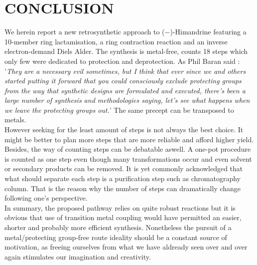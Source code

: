 \section*{CONCLUSION}
We herein report a new retrosynthetic approach to ($-$)-Himandrine featuring a 10-member ring lactamisation, a ring contraction reaction and an inverse electron-demand Diels Alder. The synthesis is metal-free, counts 18 steps which only few were dedicated to protection and deprotection. As Phil Baran said\autocite{Baran09} : \textquoteright{}\textit{They are a necessary evil sometimes, but I think that ever since we and others started putting it forward that you could consciously exclude protecting groups from the way that synthetic designs are formulated and executed, there\textquoteright{}s been a large number of synthesis and methodologies saying, let\textquoteright{}s see what happens when we leave the protecting groups out.}\textquoteright{} The same precept can be transposed to metals.\\
However seeking for the least amount of steps is not always the best choice. It might be better to plan more steps that are more reliable and afford higher yield. Besides, the way of counting steps can be debatable aswell. A one-pot procedure is counted as one step even though many transformations occur and even solvent or secondary products can be removed. It is yet commonly acknowledged that what should separate each step is a purification step such as chromatography column. That is the reason why the number of steps can dramatically change following one\textquoteright{}s perspective.\\
In summary, the proposed pathway relies on quite robust reactions but it is obvious that use of transition metal coupling would have permitted an easier, shorter and probably more efficient synthesis. Nonetheless the pursuit of a metal/protecting group-free route ideality should be a constant source of motivation, as freeing ourselves from what we have aldready seen over and over again stimulates our imagination and creativity.